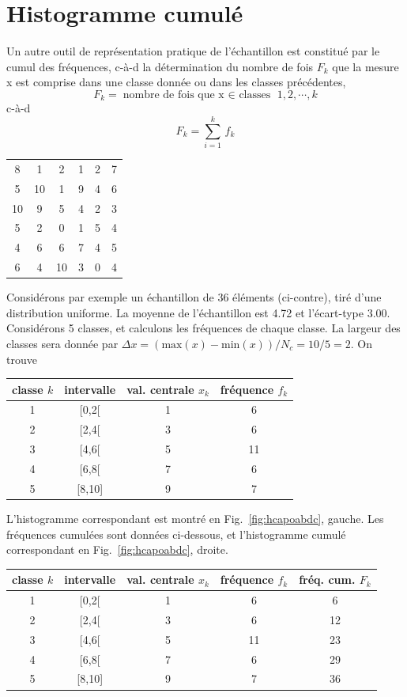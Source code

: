 \section{Histogramme cumulé}

Un autre outil de représentation pratique de l'échantillon est constitué par le cumul des fréquences, c-à-d la détermination du nombre de fois $F_k$ que la mesure x est comprise dans une classe donnée ou dans les classes précédentes,
$$
F_k=\text{nombre de fois que x $\in$ classes } 1,2,\cdots,k
$$
c-à-d
\begin{equation}
F_k=\sum\limits_{i=1}^{k}\,f_k
\end{equation}
\begin{table}
\centering
\vspace{-6mm}
\begin{tabular}{cccccc}
 8 &  1 &  2 &  1 &  2 &  7 \\
 5 & 10 &  1 &  9 &  4 &  6 \\
10 &  9 &  5 &  4 &  2 &  3 \\
 5 &  2 &  0 &  1 &  5 &  4 \\
 4 &  6 &  6 &  7 &  4 &  5 \\
 6 &  4 & 10 &  3 &  0 &  4
\end{tabular}
\end{table}
Considérons par exemple un échantillon de 36 éléments (ci-contre), tiré d'une distribution uniforme. La moyenne de l'échantillon est 4.72 et l'écart-type 3.00. Considérons 5 classes, et calculons les fréquences de chaque classe. La largeur des classes sera donnée par $\Delta x=(\text{max}(x)-\text{min}(x))/N_c=10/5=2$. On trouve
\begin{center}
\begin{tabular}{cccc}
classe $k$ & intervalle & val. centrale $x_k$ & fréquence $f_k$ \\\hline
1 & [0,2[ & 1 & 6 \\
2 & [2,4[ & 3 & 6 \\
3 & [4,6[ & 5 & 11 \\
4 & [6,8[ & 7 & 6 \\
5 & [8,10] & 9 & 7 \\\hline
\end{tabular}
\end{center}
L'histogramme correspondant est montré en Fig.~\ref{fig:hcapoabdc}, gauche. Les fréquences cumulées sont données ci-dessous, et l'histogramme cumulé correspondant en Fig.~\ref{fig:hcapoabdc}, droite.
\begin{center}
\begin{tabular}{ccccc}
classe $k$ & intervalle & val. centrale $x_k$ & fréquence $f_k$ & fréq. cum. $F_k$\\\hline
1 & [0,2[ & 1 & 6 & 6 \\
2 & [2,4[ & 3 & 6 & 12 \\
3 & [4,6[ & 5 & 11 & 23 \\
4 & [6,8[ & 7 & 6 & 29 \\
5 & [8,10] & 9 & 7 & 36\\\hline
\end{tabular}
\end{center}
